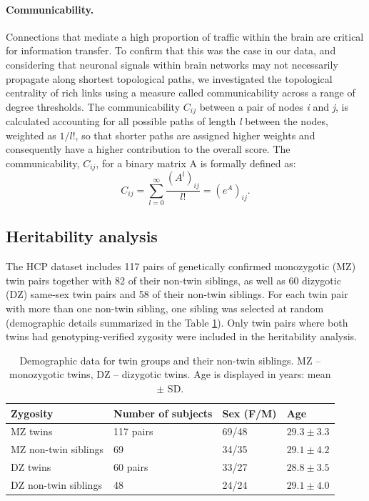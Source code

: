 \paragraph*{Communicability.}

Connections that mediate a high proportion of traffic within the brain are critical for information transfer. To confirm that this was the case in our data, and considering that neuronal signals within brain networks may not necessarily propagate along shortest topological paths, we investigated the topological centrality of rich links using a measure called communicability \citep{Estrada2008} across a range of degree thresholds. The communicability $C_{ij}$ between a pair of nodes \textit{i} and \textit{j}, is calculated accounting for all possible paths of length \textit{l} between the nodes, weighted as $1/l!$, so that shorter paths are assigned higher weights and consequently have a higher contribution to the overall score. The communicability, $C_{ij}$, for a binary matrix A is formally defined as:
\begin{equation}
    \label{eqn:Ch5Eq4}
    C_{ij}= \sum_{l=0}^{\infty}\frac{(A^{l})_{ij}}{l!} = (e^{A})_{ij}.
\end{equation}

\subsection{Heritability analysis}
\label{sec:Heritability}

The HCP dataset includes 117 pairs of genetically confirmed monozygotic (MZ) twin pairs together with 82 of their non-twin siblings, as well as 60 dizygotic (DZ) same-sex twin pairs and 58 of their non-twin siblings. For each twin pair with more than one non-twin sibling, one sibling was selected at random (demographic details summarized in the Table \ref{Ch5Table1}). Only twin pairs where both twins had genotyping-verified zygosity were included in the heritability analysis.

\begin{table}[h!]
\centering
\caption{Demographic data for twin groups and their non-twin siblings. MZ -- monozygotic twins, DZ -- dizygotic twins. Age is displayed in years: mean $\pm$ SD.}
\label{Ch5Table1}
\begin{tabular}{@{}llll@{}}
\toprule
\textbf{Zygosity} & \textbf{Number of subjects} & \textbf{Sex (F/M)} & \textbf{Age} \\ \midrule
MZ twins & 117 pairs & 69/48 & $29.3 \pm 3.3$ \\
MZ non-twin siblings & 69 & 34/35 & $29.1 \pm 4.2$ \\
DZ twins & 60 pairs & 33/27 & $28.8 \pm 3.5$ \\
DZ non-twin siblings & 48 & 24/24 & $29.1 \pm 4.0$ \\ \bottomrule
\end{tabular}
\end{table}

